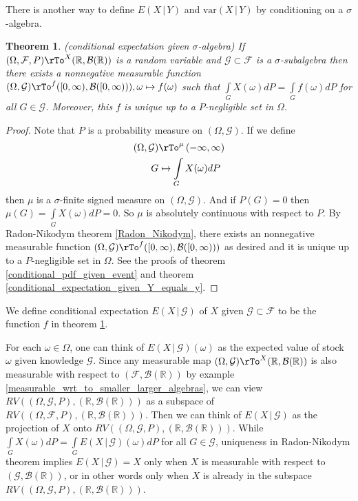 \documentclass[12pt]{amsart}
\newtheorem{theorem}{Theorem}[section]
\theoremstyle{definition}
\begin{document}
There is another way to define $E(X \,|\, Y)$ and $\text{var}(X \,|\, Y)$ by conditioning on a $\sigma$-algebra.

\begin{theorem} \label{conditional_expectation_given_sigma_algebra} (conditional expectation given $\sigma$-algebra) If $(\Omega, \mathcal{F}, P) \rTo^X (\mathbb{R}, \mathcal{B}(\mathbb{R}))$ is a random variable and $\mathcal{G} \subset \mathcal{F}$ is a $\sigma$-subalgebra then there exists a nonnegative measurable function $(\Omega, \mathcal{G}) \rTo^f ([0,\infty), \mathcal{B}([0,\infty))), \omega \mapsto f(\omega)$ such that $\int\limits_G X(\omega)dP = \int\limits_G f(\omega) dP$ for all $G \in \mathcal{G}$. Moreover, this $f$ is unique up to a $P$-negligible set in $\Omega$.
\end{theorem}
\begin{proof} Note that $P$ is a probability measure on $(\Omega, \mathcal{G})$. If we define
\begin{align*}
(\Omega, \mathcal{G}) & \rTo^{\mu} \, (-\infty, \infty) \\
G & \mapsto \int\limits_G X(\omega)dP
\end{align*}
then $\mu$ is a $\sigma$-finite signed measure on $(\Omega, \mathcal{G})$. And if $P(G) = 0$ then $\mu(G) = \int\limits_G X(\omega)dP = 0$. So $\mu$ is absolutely continuous with respect to $P$. By Radon-Nikodym theorem \ref{Radon_Nikodym}, there exists an nonnegative measurable function $(\Omega, \mathcal{G}) \rTo^f ([0,\infty), \mathcal{B}([0,\infty)))$ as desired and it is unique up to a $P$-negligible set in $\Omega$. See the proofs of theorem \ref{conditional_pdf_given_event} and theorem \ref{conditional_expectation_given_Y_equals_y}.
\end{proof}

\dfn\label{define_conditional_expectation_given_sigma_algebra} We define conditional expectation $E(X \,|\, \mathcal{G})$ of $X$ given $\mathcal{G} \subset \mathcal{F}$ to be the function $f$ in theorem \ref{conditional_expectation_given_sigma_algebra}.

For each $\omega \in \Omega$, one can think of $E(X \,|\, \mathcal{G})(\omega)$ as the expected value of stock $\omega$ given knowledge $\mathcal{G}$. Since any measurable map $(\Omega, \mathcal{G}) \rTo^X (\mathbb{R}, \mathcal{B}(\mathbb{R}))$ is also measurable with respect to $(\mathcal{F}, \mathcal{B}(\mathbb{R}))$ by example \ref{measurable_wrt_to_smaller_larger_algebras}, we can view $RV((\Omega, \mathcal{G}, P), (\mathbb{R}, \mathcal{B}(\mathbb{R})))$ as a subspace of $RV((\Omega, \mathcal{F}, P), (\mathbb{R}, \mathcal{B}(\mathbb{R})))$. Then we can think of $E(X \,|\, \mathcal{G})$ as the projection of $X$ onto $RV((\Omega, \mathcal{G}, P), (\mathbb{R}, \mathcal{B}(\mathbb{R})))$. While $\int\limits_G X(\omega) dP = \int\limits_G E(X \,|\, \mathcal{G})(\omega) dP$ for all $G \in \mathcal{G}$, uniqueness in Radon-Nikodym theorem implies $E(X \,|\, \mathcal{G}) = X$ only when $X$ is measurable with respect to $(\mathcal{G}, \mathcal{B}(\mathbb{R}))$, or in other words only when $X$ is already in the subspace $RV((\Omega, \mathcal{G}, P), (\mathbb{R}, \mathcal{B}(\mathbb{R})))$.
\end{document}
